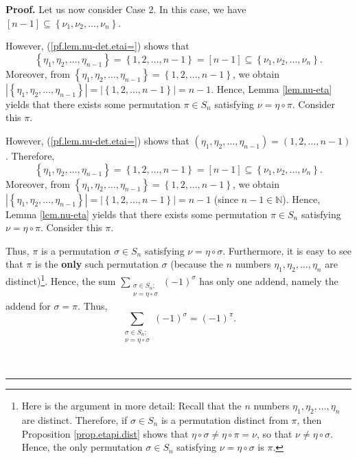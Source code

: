 \documentclass[numbers=enddot,12pt,final,onecolumn,notitlepage,english]{scrartcl}%
\theoremstyle{definition}
\newenvironment{proof}[1][Proof]{\noindent\textbf{#1.} }{\ \rule{0.5em}{0.5em}}
\let\sumnonlimits\sum
\renewcommand{\sum}{\sumnonlimits\limits}
\newenvironment{verlong}{}{}
\newenvironment{vershort}{}{}
\begin{document}
\begin{proof}
Let us now consider Case 2. In this case, we have $\left[  n-1\right]
\subseteq\left\{  \nu_{1},\nu_{2},\ldots,\nu_{n}\right\}  $.

\begin{vershort}
However, (\ref{pf.lem.nu-det.etai=}) shows that
\[
\left\{  \eta_{1},\eta_{2},\ldots,\eta_{n-1}\right\}  =\left\{  1,2,\ldots
,n-1\right\}  =\left[  n-1\right]  \subseteq\left\{  \nu_{1},\nu_{2}%
,\ldots,\nu_{n}\right\}  .
\]
Moreover, from $\left\{  \eta_{1},\eta_{2},\ldots,\eta_{n-1}\right\}
=\left\{  1,2,\ldots,n-1\right\}  $, we obtain $\left\vert \left\{  \eta
_{1},\eta_{2},\ldots,\eta_{n-1}\right\}  \right\vert =\left\vert \left\{
1,2,\ldots,n-1\right\}  \right\vert =n-1$. Hence, Lemma \ref{lem.nu-eta}
yields that there exists some permutation $\pi\in S_{n}$ satisfying $\nu
=\eta\circ\pi$. Consider this $\pi$.
\end{vershort}

\begin{verlong}
However, (\ref{pf.lem.nu-det.etai=}) shows that $\left(  \eta_{1},\eta
_{2},\ldots,\eta_{n-1}\right)  =\left(  1,2,\ldots,n-1\right)  $. Therefore,
\[
\left\{  \eta_{1},\eta_{2},\ldots,\eta_{n-1}\right\}  =\left\{  1,2,\ldots
,n-1\right\}  =\left[  n-1\right]  \subseteq\left\{  \nu_{1},\nu_{2}%
,\ldots,\nu_{n}\right\}  .
\]
Moreover, from $\left\{  \eta_{1},\eta_{2},\ldots,\eta_{n-1}\right\}
=\left\{  1,2,\ldots,n-1\right\}  $, we obtain $\left\vert \left\{  \eta
_{1},\eta_{2},\ldots,\eta_{n-1}\right\}  \right\vert =\left\vert \left\{
1,2,\ldots,n-1\right\}  \right\vert =n-1$ (since $n-1\in\mathbb{N}$). Hence,
Lemma \ref{lem.nu-eta} yields that there exists some permutation $\pi\in
S_{n}$ satisfying $\nu=\eta\circ\pi$. Consider this $\pi$.
\end{verlong}

\begin{vershort}
Thus, $\pi$ is a permutation $\sigma\in S_{n}$ satisfying $\nu=\eta\circ
\sigma$. Furthermore, it is easy to see that $\pi$ is the \textbf{only} such
permutation $\sigma$ (because the $n$ numbers $\eta_{1},\eta_{2},\ldots
,\eta_{n}$ are distinct)\footnote{Here is the argument in more detail: Recall
that the $n$ numbers $\eta_{1},\eta_{2},\ldots,\eta_{n}$ are distinct.
Therefore, if $\sigma\in S_{n}$ is a permutation distinct from $\pi$, then
Proposition \ref{prop.etapi.dist} shows that $\eta\circ\sigma\neq\eta\circ
\pi=\nu$, so that $\nu\neq\eta\circ\sigma$. Hence, the only permutation
$\sigma\in S_{n}$ satisfying $\nu=\eta\circ\sigma$ is $\pi$.}. Hence, the sum
$\sum_{\substack{\sigma\in S_{n};\\\nu=\eta\circ\sigma}}\left(  -1\right)
^{\sigma}$ has only one addend, namely the addend for $\sigma=\pi$. Thus,
\begin{equation}
\sum_{\substack{\sigma\in S_{n};\\\nu=\eta\circ\sigma}}\left(  -1\right)
^{\sigma}=\left(  -1\right)  ^{\pi}. \label{pf.lem.nu-det.c2.short.sum=}%
\end{equation}


\end{vershort}
\end{proof}
\end{document}
